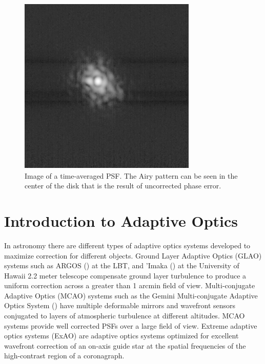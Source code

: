 \begin{figure}
    \centering
    \includegraphics{Chapter Materials/Chapter One Materials/turbPSF.png}
    \caption{Image of a time-averaged PSF. The Airy pattern can be seen in the center of the disk that is the result of uncorrected phase error.}
    \label{fig:turbPSF}
\end{figure}


 \section{Introduction to Adaptive Optics}
 

In astronomy there are different types of adaptive optics systems developed to maximize correction for different objects. Ground Layer Adaptive Optics (GLAO) systems such as ARGOS (\cite{rabien2019argos}) at the LBT, and 'Imaka (\cite{abdurrahman2018improved}) at the University of Hawaii 2.2 meter telescope compensate ground layer turbulence to produce a uniform correction across a greater than 1 arcmin field of view. Multi-conjugate Adaptive Optics (MCAO) systems such as the Gemini Multi-conjugate Adaptive Optics System (\cite{neichel2014gemini}) have multiple deformable mirrors and wavefront sensors conjugated to layers of atmospheric turbulence at different altitudes. MCAO systems provide well corrected PSFs over a large field of view. Extreme adaptive optics systems (ExAO) are adaptive optics systems optimized for excellent wavefront correction of an on-axis guide star at the spatial frequencies of the high-contrast region of a coronagraph. 

